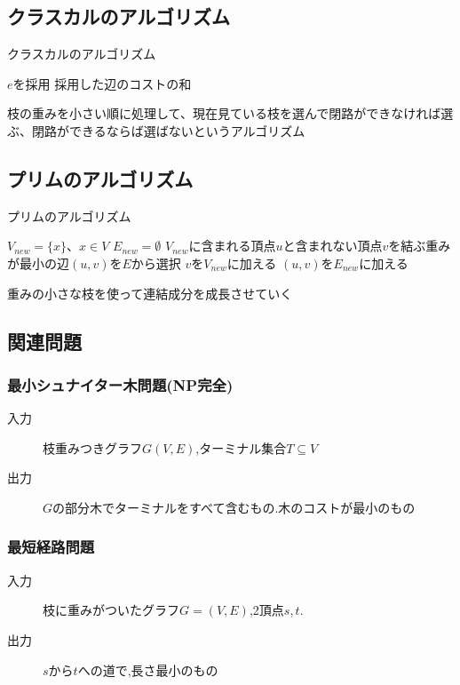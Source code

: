 \documentclass[a4j,10.5pt]{jarticle}
\begin{document}
\subsection{クラスカルのアルゴリズム}

\begin{algorithm}
\caption{クラスカルのアルゴリズム}
\begin{algorithmic}[1]
\STATE $e$を採用
\ENDIF
\ENDFOR
\RETURN 採用した辺のコストの和
\end{algorithmic}
\end{algorithm}

枝の重みを小さい順に処理して、現在見ている枝を選んで閉路ができなければ選ぶ、閉路ができるならば選ばないというアルゴリズム

\subsection{プリムのアルゴリズム}
\begin{algorithm}
\caption{プリムのアルゴリズム}
\begin{algorithmic}[1]
\STATE $V_{new} = \{x\}、x \in V$
\STATE $E_{new} = \emptyset$
\STATE $V_{new}$に含まれる頂点$u$と含まれない頂点$v$を結ぶ重みが最小の辺$(u,v)$を$E$から選択
\STATE $v$を$V_{new}$に加える
\STATE $(u,v)$を$E_{new}$に加える
\ENDWHILE
\end{algorithmic}
\end{algorithm}

重みの小さな枝を使って連結成分を成長させていく

\subsection{関連問題}
\subsubsection*{最小シュナイター木問題(NP完全)}
\begin{description}
\item[入力] 枝重みつきグラフ$G(V,E)$,ターミナル集合$T \subseteq V$
\item[出力] $G$の部分木でターミナルをすべて含むもの.木のコストが最小のもの
\end{description}
\subsubsection*{最短経路問題}
\begin{description}
\item[入力] 枝に重みがついたグラフ$G=(V,E)$,2頂点$s,t$.
\item[出力] $s$から$t$への道で,長さ最小のもの
\end{description}
\end{document}
